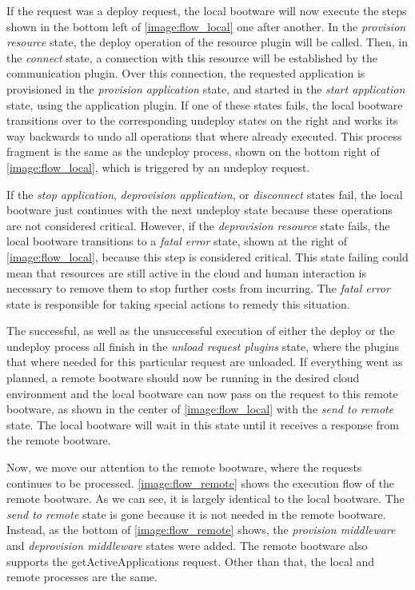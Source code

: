 If the request was a deploy request, the local bootware will now execute the steps shown in the bottom left of \autoref{image:flow_local} one after another.
In the \textit{provision resource} state, the deploy operation of the resource plugin will be called.
Then, in the \textit{connect} state, a connection with this resource will be established by the communication plugin.
Over this connection, the requested application is provisioned in the \textit{provision application} state, and started in the \textit{start application} state, using the application plugin.
If one of these states fails, the local bootware transitions over to the corresponding undeploy states on the right and works its way backwards to undo all operations that where already executed.
This process fragment is the same as the undeploy process, shown on the bottom right of \autoref{image:flow_local}, which is triggered by an undeploy request.

If the \textit{stop application}, \textit{deprovision application}, or \textit{disconnect} states fail, the local bootware just continues with the next undeploy state because these operations are not considered critical.
However, if the \textit{deprovision resource} state fails, the local bootware transitions to a \textit{fatal error} state, shown at the right of \autoref{image:flow_local}, because this step is considered critical.
This state failing could mean that resources are still active in the cloud and human interaction is necessary to remove them to stop further costs from incurring.
The \textit{fatal error} state is responsible for taking special actions to remedy this situation.

The successful, as well as the unsuccessful execution of either the deploy or the undeploy process all finish in the \textit{unload request plugins} state, where the plugins that where needed for this particular request are unloaded.
If everything went as planned, a remote bootware should now be running in the desired cloud environment and the local bootware can now pass on the request to this remote bootware, as shown in the center of \autoref{image:flow_local} with the \textit{send to remote} state.
The local bootware will wait in this state until it receives a response from the remote bootware.

Now, we move our attention to the remote bootware, where the requests continues to be processed.
\autoref{image:flow_remote} shows the execution flow of the remote bootware.
As we can see, it is largely identical to the local bootware.
The \textit{send to remote} state is gone because it is not needed in the remote bootware.
Instead, as the bottom of \autoref{image:flow_remote} shows, the \textit{provision middleware} and \textit{deprovision middleware} states were added.
The remote bootware also supports the getActiveApplications request.
Other than that, the local and remote processes are the same.

